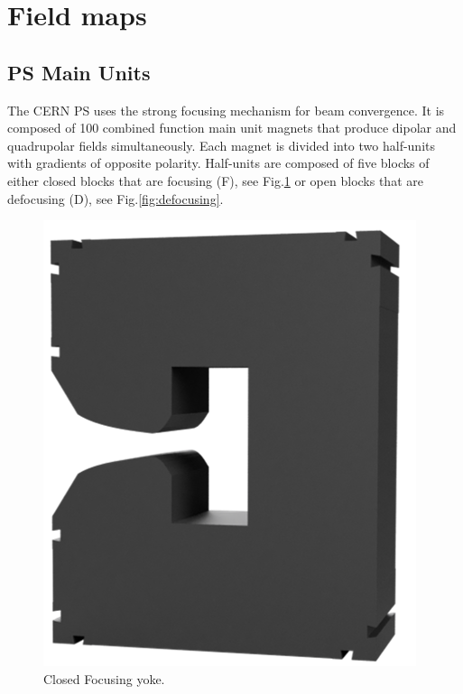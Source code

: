 \documentclass[a4paper,
               biblatex,     %
               keeplastbox,   %
               ]{jacow}
\begin{document}
\section{Field maps}
\subsection{PS Main Units}
The CERN PS uses the strong focusing mechanism for beam convergence. It is composed of 100 combined function main unit magnets that produce dipolar and quadrupolar fields simultaneously. Each magnet is divided into two half-units with gradients of opposite polarity. Half-units are composed of five blocks of either closed blocks that are focusing (F), see Fig.\ref{fig:focusing} or open blocks that are defocusing (D), see Fig.\ref{fig:defocusing}.

\begin{figure}[!htb]
  \centering
  \begin{minipage}[b]{0.45\columnwidth}
    \includegraphics*[width=\textwidth]{MOPOTK030_f1.png}
    \caption{Closed Focusing yoke.}
    \label{fig:focusing}
  \end{minipage}

\end{figure}
\end{document}
